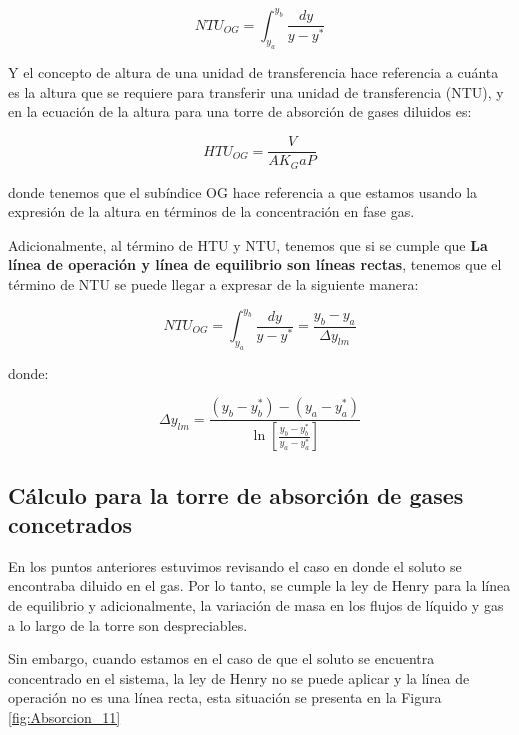\documentclass[11pt]{book}
\begin{document}
\begin{equation}
    \label{eq:Absorcion_46}
    NTU_{OG} = \int_{y_a}^{y_b} \frac{dy}{y-y^*}
\end{equation}

Y el concepto de altura de una unidad de transferencia hace referencia a cuánta es la altura que se requiere para transferir una unidad de transferencia (NTU), y en la ecuación de la altura para una torre de absorción de gases diluidos es:

\begin{equation}
     \label{eq:Absorcion_47}
     HTU_{OG} = \frac{V}{A K_G a P}
\end{equation}

donde tenemos que el subíndice OG hace referencia a que estamos usando la expresión de la altura en términos de la concentración en fase gas.

Adicionalmente, al término de HTU y NTU, tenemos que si se cumple que \textbf{La línea de operación y línea de equilibrio son líneas rectas}, tenemos que el término de NTU se puede llegar a expresar de la siguiente manera:

\begin{equation}
    \label{eq:Absorcion_48}
    NTU_{OG} = \int_{y_a}^{y_b} \frac{dy}{y-y^*} = \frac{y_b-y_a}{\Delta y_{lm}}
\end{equation}

donde:

\begin{equation*}
    \Delta y_{lm} = \frac{(y_b - y_b^*) - (y_a - y_a^*)}{\ln \left[ \frac{y_b - y_b^*}{y_a - y_a^*}\right]}
\end{equation*}

\subsection{Cálculo para la torre de absorción de gases concetrados}

En los puntos anteriores estuvimos revisando el caso en donde el soluto se encontraba diluido en el gas. Por lo tanto, se cumple la ley de Henry para la línea de equilibrio y adicionalmente, la variación de masa en los flujos de líquido y gas a lo largo de la torre son despreciables.

Sin embargo, cuando estamos en el caso de que el soluto se encuentra concentrado en el sistema, la ley de Henry no se puede aplicar y la línea de operación no es una línea recta, esta situación se presenta en la Figura \ref{fig:Absorcion_11}
\end{document}
